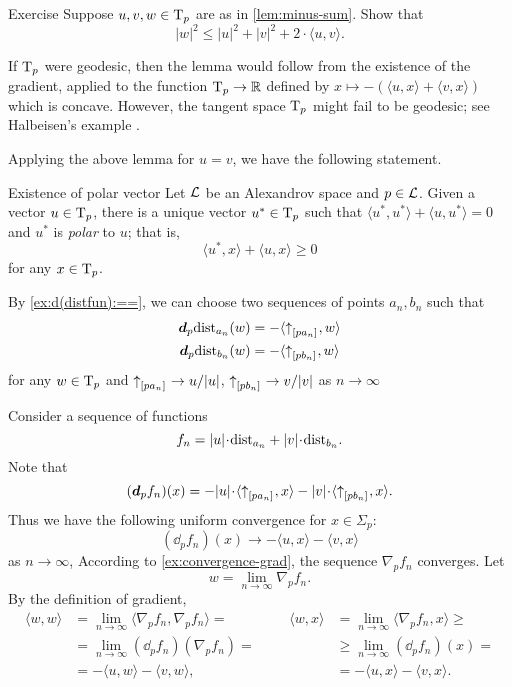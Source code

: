 \begin{thm}{Exercise}\label{ex:|antisum|}
Suppose $u,v, w\in \mathrm{T}_p$ are as in \ref{lem:minus-sum}.
Show that 
\[|w|^2\le |u|^2+|v|^2+2\cdot\langle u,v\rangle.\]

\end{thm}

If $\mathrm{T}_p$ were geodesic, then the lemma would follow from the existence  of the gradient, applied to the function $\mathrm{T}_p\to \mathbb{R}$ defined by $x\mapsto -(\langle u,x\rangle +\langle v,x\rangle )$ which is concave.
However, the tangent space $\mathrm{T}_p$ might fail to be geodesic; see  Halbeisen's example \cite{alexander-kapovitch-petrunin2024}.

Applying the above lemma for $u=v$, we have the following statement.

\begin{thm}{Existence of polar vector}\label{cor:polar}
Let $\mathcal{L}$ be an Alexandrov space 
and $p\in \mathcal{L}$. 
Given a vector $u\in \mathrm{T}_p$,  there is a unique vector $u^*\in\mathrm{T}_p$ such that $\langle u^*,u^*\rangle +\langle u,u^*\rangle = 0$ and
$u^*$ is \emph{polar} to $u$;
that is,
\[\langle u^*,x\rangle +\langle u,x\rangle \ge 0\]
for any $x\in \mathrm{T}_p$.
\end{thm}

By \ref{ex:d(distfun):==}, we can choose two sequences of points $a_n,b_n$ such that 
\begin{align*}
\bm{d}_p\mathrm{dist}_{a_n}(w)&=-\langle{\uparrow}_{[{p}{a_n}]_{{}}},w\rangle
\\
\bm{d}_p\mathrm{dist}_{b_n}(w)&=-\langle{\uparrow}_{[{p}{b_n}]_{{}}},w\rangle
\end{align*}
for any $w\in\mathrm{T}_p$ and ${\uparrow}_{[{p}{a_n}]_{{}}}\to u/|u|$, ${\uparrow}_{[{p}{b_n}]_{{}}}\to v/|v|$ as $n\to \infty$

Consider a sequence of functions 
\[f_n=|u|\cdot\distfun_{a_n}+|v|\cdot\distfun_{b_n}.\]
Note that 
\[(\dd_pf_n)(x)=-|u|\cdot\langle \dir{p}{a_n},x\rangle -|v|\cdot\langle \dir{p}{b_n},x\rangle .\]
Thus we have the following uniform convergence for $x\in\Sigma_p$:
\[(\dd_pf_n)(x)\to-\langle u,x\rangle -\langle v,x\rangle \]
as $n\to\infty$,
According to \ref{ex:convergence-grad}, 
the sequence $\nabla_pf_n$ converges.
Let 
\[w=\lim_{n\to\infty}\nabla_pf_n.\]
By the definition of gradient,
\[\begin{aligned}
\langle w,w\rangle &=\lim_{n\to\infty}\langle \nabla_pf_n,\nabla_pf_n\rangle =
&&&%
\langle w,x\rangle &=\lim_{n\to\infty}\langle \nabla_pf_n,x\rangle \ge
\\%
&=\lim_{n\to\infty}(\dd_p f_n)(\nabla_p f_n)
=
&&&%
&\ge
\lim_{n\to\infty}(\dd_pf_n)(x)
=
\\%
&=-\langle u,w\rangle -\langle v,w\rangle ,
&&&%
&=-\langle u,x\rangle -\langle v,x\rangle .
\end{aligned}\]
\qedsf

